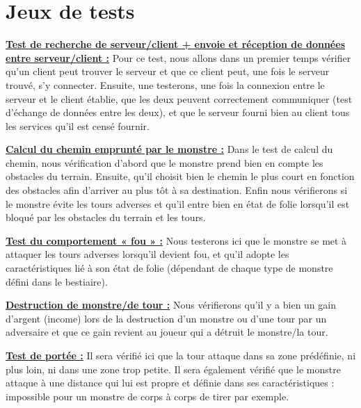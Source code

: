 \documentclass[12pt, letterpaper]{article}
\begin{document}
{\section{Jeux de tests}
\textbf{\underline{Test de recherche de serveur/client + envoie et réception de \newline données entre serveur/client :}} \newline
Pour ce test, nous allons dans un premier temps vérifier qu’un client peut trouver le serveur et que ce client peut, une fois le serveur trouvé, s’y connecter. Ensuite, une testerons, une fois la connexion entre le serveur et le client établie, que les deux peuvent correctement communiquer (test d’échange de données entre les deux), et que le serveur fourni bien au client tous les services qu’il est censé fournir.

\textbf{\underline{Calcul du chemin emprunté par le monstre :}} \newline
Dans le test de calcul du chemin, nous vérification d’abord que le monstre prend bien en compte les obstacles du terrain. Ensuite, qu’il choisit bien le chemin le plus court en fonction des obstacles afin d’arriver au plus tôt à sa destination. Enfin nous vérifierons si le monstre évite les tours adverses et qu’il  entre bien en état de folie lorsqu’il est bloqué par les obstacles du terrain et les tours.

\textbf{\underline{Test du comportement « fou » :}} \newline
Nous testerons ici que le monstre se met à attaquer les tours adverses lorsqu’il devient fou, et qu’il adopte les caractéristiques lié à son état de folie (dépendant de chaque type de monstre défini dans le bestiaire).

\textbf{\underline{Destruction de monstre/de tour :}} \newline
Nous vérifierons qu’il y a bien un gain d’argent (income) lors de la destruction d’un monstre ou d’une tour par un adversaire et que ce gain revient au joueur qui a détruit le monstre/la tour.

\textbf{\underline{Test de portée :}} \newline
Il sera vérifié ici que la tour attaque dans sa zone prédéfinie, ni plus loin, ni dans une zone trop petite. Il sera également vérifié que le monstre attaque à une distance qui lui est propre et définie dans ses caractéristiques : impossible pour un monstre de corps à corps de tirer par exemple.

\clearpage
\BgThispage

}
\end{document}
